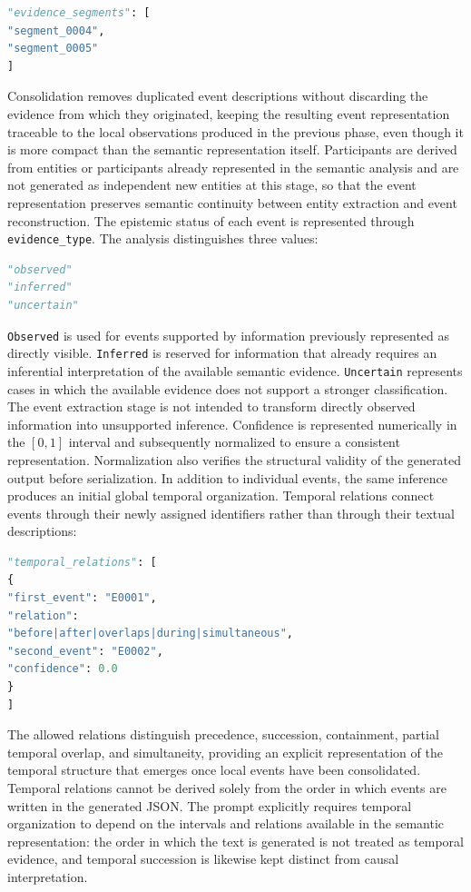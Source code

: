 \begin{lstlisting}[language=Python]
"evidence_segments": [
"segment_0004",
"segment_0005"
]
\end{lstlisting}
Consolidation removes duplicated event descriptions without discarding the evidence from which they originated, keeping the resulting event representation traceable to the local observations produced in the previous phase, even though it is more compact than the semantic representation itself.
Participants are derived from entities or participants already represented in the semantic analysis and are not generated as independent new entities at this stage, so that the event representation preserves semantic continuity between entity extraction and event reconstruction.
The epistemic status of each event is represented through \texttt{evidence\_type}. The analysis distinguishes three values:
\begin{lstlisting}[language=Python]
"observed"
"inferred"
"uncertain"
\end{lstlisting}
\texttt{Observed} is used for events supported by information previously represented as directly visible. \texttt{Inferred} is reserved for information that already requires an inferential interpretation of the available semantic evidence. \texttt{Uncertain} represents cases in which the available evidence does not support a stronger classification. The event extraction stage is not intended to transform directly observed information into unsupported inference.
Confidence is represented numerically in the $[0,1]$ interval and subsequently normalized to ensure a consistent representation. Normalization also verifies the structural validity of the generated output before serialization.
In addition to individual events, the same inference produces an initial global temporal organization. Temporal relations connect events through their newly assigned identifiers rather than through their textual descriptions:
\begin{lstlisting}[language=Python]
"temporal_relations": [
{
"first_event": "E0001",
"relation":
"before|after|overlaps|during|simultaneous",
"second_event": "E0002",
"confidence": 0.0
}
]
\end{lstlisting}
The allowed relations distinguish precedence, succession, containment, partial temporal overlap, and simultaneity, providing an explicit representation of the temporal structure that emerges once local events have been consolidated.
Temporal relations cannot be derived solely from the order in which events are written in the generated JSON. The prompt explicitly requires temporal organization to depend on the intervals and relations available in the semantic representation: the order in which the text is generated is not treated as temporal evidence, and temporal succession is likewise kept distinct from causal interpretation.
